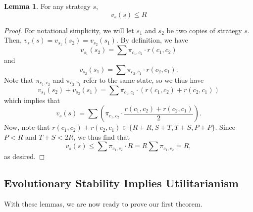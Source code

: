 \documentclass[11pt]{amsart}
\theoremstyle{definition}
\newtheorem{lemma}{Lemma}
\theoremstyle{remark}
\begin{document}
\begin{lemma}
  \label{neverbetterthanr}
  For any strategy $s$,
  \begin{equation*}
    v_{s}(s) \leq R
  \end{equation*}
\end{lemma}
\begin{proof}
  For notational simplicity, we will let $s_1$ and $s_2$ be two copies of strategy $s$. Then, $v_{s}(s) = v_{s_1}(s_2) = v_{s_2}(s_1)$. By definition, we have
  \begin{equation*}
    v_{s_1}(s_2) = \sum \pi_{c_1,c_2} \cdot r(c_1,c_2)
  \end{equation*}
  and
  \begin{equation*}
    v_{s_2}(s_1) = \sum \pi_{c_2,c_1} \cdot r(c_2,c_1).
  \end{equation*}
  Note that $\pi_{c_1,c_2}$ and $\pi_{c_2,c_1}$ refer to the same state, so we thus have \begin{equation*}
    v_{s_1}(s_2) + v_{s_2}(s_1) = \sum \pi_{c_1,c_2} \cdot (r(c_1,c_2) + r(c_2,c_1))
  \end{equation*}
  which implies that \begin{equation*}
    v_s(s) = \sum \left( \pi_{c_1,c_2} \cdot \frac{r(c_1,c_2) + r(c_2,c_1)}{2} \right).
  \end{equation*}
  Now, note that $r(c_1,c_2) + r(c_2,c_1) \in \{R + R, S + T, T+S, P + P\}$. Since $P < R$ and $T + S < 2R$, we thus find that \begin{equation*}
    v_s(s) \leq \sum \pi_{c_1,c_2} \cdot R = R \sum \pi_{c_1,c_2} = R,
  \end{equation*}
  as desired.
\end{proof}

\subsection{Evolutionary Stability Implies Utilitarianism}

With these lemmas, we are now ready to prove our first theorem.
\end{document}
